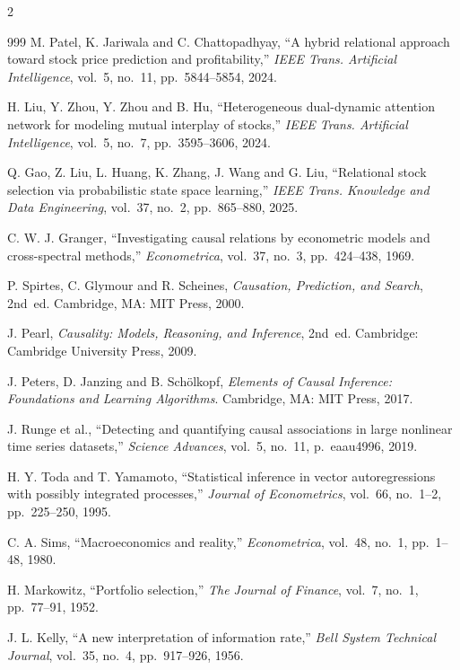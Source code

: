 \begin{footnotesize}
\begin{multicols}{2}
\begin{thebibliography}{999}
 M. Patel, K. Jariwala and C. Chattopadhyay, ``A hybrid relational
approach toward stock price prediction and profitability,'' \emph{IEEE Trans. Artificial
Intelligence}, vol.~5, no.~11, pp.~5844--5854, 2024.

 H. Liu, Y. Zhou, Y. Zhou and B. Hu, ``Heterogeneous dual-dynamic
attention network for modeling mutual interplay of stocks,'' \emph{IEEE Trans. Artificial
Intelligence}, vol.~5, no.~7, pp.~3595--3606, 2024.

 Q. Gao, Z. Liu, L. Huang, K. Zhang, J. Wang and G. Liu, ``Relational
stock selection via probabilistic state space learning,'' \emph{IEEE Trans. Knowledge and Data
Engineering}, vol.~37, no.~2, pp.~865--880, 2025.

 C. W. J. Granger, ``Investigating causal relations by econometric models and
cross-spectral methods,'' \emph{Econometrica}, vol.~37, no.~3, pp.~424--438, 1969.

 P. Spirtes, C. Glymour and R. Scheines, \emph{Causation, Prediction, and
Search}, 2nd~ed. Cambridge, MA: MIT Press, 2000.

 J. Pearl, \emph{Causality: Models, Reasoning, and Inference}, 2nd~ed.
Cambridge: Cambridge University Press, 2009.

 J. Peters, D. Janzing and B. Sch\"olkopf, \emph{Elements of Causal Inference:
Foundations and Learning Algorithms}. Cambridge, MA: MIT Press, 2017.

 J. Runge et al., ``Detecting and quantifying causal associations in large
nonlinear time series datasets,'' \emph{Science Advances}, vol.~5, no.~11, p.~eaau4996, 2019.

 H. Y. Toda and T. Yamamoto, ``Statistical inference in vector autoregressions
with possibly integrated processes,'' \emph{Journal of Econometrics}, vol.~66, no.~1--2,
pp.~225--250, 1995.

 C. A. Sims, ``Macroeconomics and reality,'' \emph{Econometrica}, vol.~48,
no.~1, pp.~1--48, 1980.

 H. Markowitz, ``Portfolio selection,'' \emph{The Journal of Finance},
vol.~7, no.~1, pp.~77--91, 1952.

 J. L. Kelly, ``A new interpretation of information rate,'' \emph{Bell System
Technical Journal}, vol.~35, no.~4, pp.~917--926, 1956.


\end{thebibliography}
\end{multicols}
\end{footnotesize}
